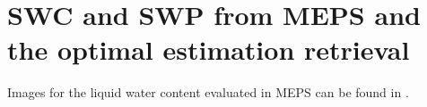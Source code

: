 \section{SWC and SWP from MEPS and the optimal estimation retrieval}
Images for the liquid water content evaluated in MEPS can be found in . 







